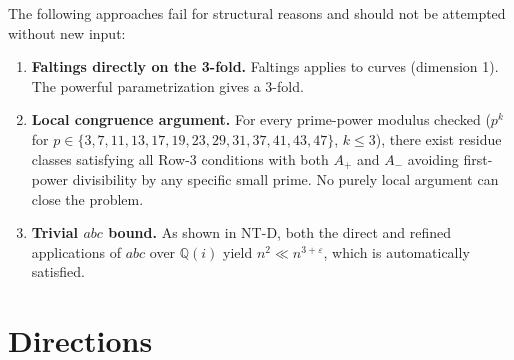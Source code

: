 \documentclass[12pt]{amsart}
\theoremstyle{plain}
\theoremstyle{definition}
\theoremstyle{remark}
\newcommand{\QQ}{\mathbb{Q}}
\newcommand{\Aplus}{A_{+}}
\newcommand{\Aminus}{A_{-}}
\begin{document}
The following approaches fail for structural reasons and should not be
attempted without new input:

\begin{enumerate}[label=(D\arabic*)]
\item \textbf{Faltings directly on the 3-fold.}
  Faltings applies to curves (dimension 1).  The powerful
  parametrization gives a $3$-fold.

\item \textbf{Local congruence argument.}
  For every prime-power modulus checked ($p^k$ for
  $p\in\{3,7,11,13,17,19,23,29,31,37,41,43,47\}$, $k\leq 3$), there exist
  residue classes satisfying all Row-3 conditions with both $\Aplus$ and
  $\Aminus$ avoiding first-power divisibility by any specific small prime.
  No purely local argument can close the problem.

\item \textbf{Trivial $abc$ bound.}
  As shown in NT-D, both the direct and refined applications of $abc$
  over $\QQ(i)$ yield $n^2\ll n^{3+\varepsilon}$, which is automatically
  satisfied.
\end{enumerate}

\section{Directions}
\label{sec:directions}
\end{document}
